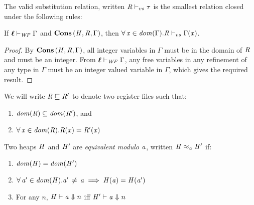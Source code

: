 
\begin{definition}
  The valid substitution relation, written $ \mathit{R} \vdash _{vs}  \tau $ is the smallest relation closed
  under the following rules:
\end{definition}

\begin{lemma} %
  \label{lem:r-valid-subst}
  If $ \oldvec{\ell}   \vdash _{\wf}  \Gamma $ and $\mathbf{Cons} \, (  \mathit{H}  ,  \mathit{R}  ,  \Gamma  )$, then $\forall \,  \mathit{x}  \in   \mathit{dom}( \Gamma )    .   \mathit{R} \vdash _{vs}  \Gamma  (  \mathit{x}  ) $.
\end{lemma}
\begin{proof}
  By $\mathbf{Cons} \, (  \mathit{H}  ,  \mathit{R}  ,  \Gamma  )$, all integer variables in $\Gamma$ must be in
  the domain of $\mathit{R}$ and must be an integer. From $ \oldvec{\ell}   \vdash _{\wf}  \Gamma $, any free variables
  in any refinement of any type in $\Gamma$ must be an integer valued variable in $\Gamma$,
  which gives the required result.
\end{proof}

\begin{definition}
  We will write $ \mathit{R}  \sqsubseteq  \mathit{R'} $ to denote two register files such that:
  \begin{enumerate}
  \item $ \mathit{dom}( \mathit{R} )  \subseteq  \mathit{dom}( \mathit{R'} ) $, and
  \item $\forall \,  \mathit{x}  \in \mathit{dom}( \mathit{R} )   .  \mathit{R}  (  \mathit{x}  )  =  \mathit{R'}  (  \mathit{x}  )$
  \end{enumerate}
\end{definition}

\begin{definition}
  Two heaps $\mathit{H}$ and $\mathit{H'}$ are \emph{equivalent modulo $\mathit{a}$}, written $ \mathit{H}   \approx _ {\mathit{a}}   \mathit{H'} $ if:
  \begin{enumerate}
  \item $ \mathit{dom}( \mathit{H} )   =   \mathit{dom}( \mathit{H'} ) $
  \item $\forall \,  \mathit{a'}  \in   \mathit{dom}( \mathit{H} )    .  \mathit{a'} \, \neq \, \mathit{a}  \implies  \mathit{H}  (  \mathit{a}  )  =  \mathit{H}  (  \mathit{a'}  )$
  \item For any $n$, $ \mathit{H} \vdash   \mathit{a}  \Downarrow  n $ iff $ \mathit{H'} \vdash   \mathit{a}  \Downarrow  n $
  \end{enumerate}
\end{definition}

